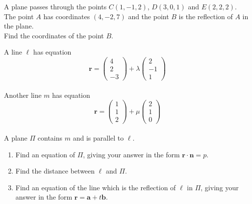 \documentclass[leqno]{article}
\begin{document}
\djsFrontMatter
\begin{enumerate}[
  label=\textbf{\arabic*.},
  leftmargin=*,
  topsep=0pt,
  partopsep=0pt,
  parsep=0pt
]


\questionitem

A plane passes through the points $C(1,-1,2)$, $D(3,0,1)$ and $E(2,2,2)$. \\

The point $A$ has coordinates $(4,-2,7)$ and the point $B$ is the reflection of $A$ in the plane. \\

Find the coordinates of the point $B$. 

\newpage

\questionitem

A line $\ell$ has equation
\[
\mathbf{r}=\begin{pmatrix}4\\2\\-3\end{pmatrix}+\lambda\begin{pmatrix}2\\-1\\1\end{pmatrix}
\] \\
Another line $m$ has equation
\[
\mathbf{r}=\begin{pmatrix}1\\1\\2\end{pmatrix}+\mu\begin{pmatrix}2\\1\\0\end{pmatrix}
\] \\
A plane $\Pi$ contains $m$ and is parallel to $\ell$. \\
\begin{enumerate}[label=\textbf{(\roman*)}]
  \item Find an equation of $\Pi$, giving your answer in the form $\mathbf{r}\cdot\mathbf{n}=p$.  \\
  \item Find the distance between $\ell$ and $\Pi$.  \\
  \item Find an equation of the line which is the reflection of $\ell$ in $\Pi$, giving your answer in the form $\mathbf{r}=\mathbf{a}+t\mathbf{b}$.  \\
\end{enumerate}


\end{enumerate}
\end{document}
